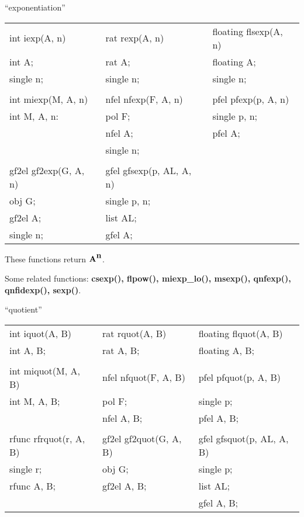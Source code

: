 \leer
\begin{center} ``exponentiation'' \end{center}
\begin{center}
{\bf
\begin{tabular}{lll}
int iexp(A, n) & rat rexp(A, n) & floating flsexp(A, n)\\
int A;         & rat A;         & floating A;\\
single n;      & single n;      & single n;\\
&&\\
int miexp(M, A, n) & nfel nfexp(F, A, n) & pfel pfexp(p, A, n)\\
int M, A, n:       & pol F;              & single p, n;\\
                   & nfel A;             & pfel A;\\
                   & single n;           & \\
&&\\
gf2el gf2exp(G, A, n) & gfel gfsexp(p, AL, A, n) &\\
obj G;                & single p, n;             &\\
gf2el A;              & list AL;                 &\\
single n;             & gfel A;                  &\\[1.5ex]
\end{tabular} }
\end{center}

These functions return $\mbox{\bf A}^{\mbox{\bf n}}$.

Some related functions:\hspace*{0.7em}
{\bf csexp(), flpow(), miexp\_lo(), msexp(), qnfexp(), \\
qnfidexp(), sexp()}.

\begin{center} ``quotient'' \end{center}
\begin{center}
{\bf
\begin{tabular}{lll}
int iquot(A, B) & rat rquot(A, B) & floating flquot(A, B)\\
int A, B;      & rat A, B;      & floating A, B;\\
&&\\
int miquot(M, A, B) & nfel nfquot(F, A, B) & pfel pfquot(p, A, B)\\
int M, A, B;       & pol F;              & single p;\\
                   & nfel A, B;          & pfel A, B;\\
&&\\
rfunc rfrquot(r, A, B) & gf2el gf2quot(G, A, B) & gfel gfsquot(p, AL, A, B)\\
single r;             & obj G;                & single p;\\
rfunc A, B;           & gf2el A, B;           & list AL;\\
                      &                       & gfel A, B;\\[1.5ex]
\end{tabular} }
\end{center}

